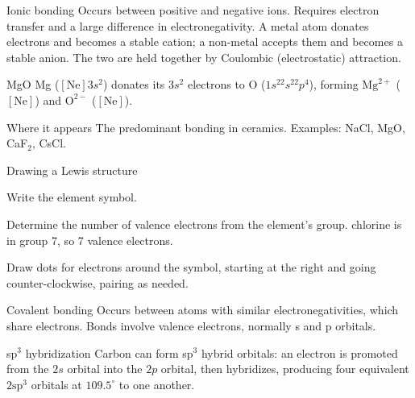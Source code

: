 \documentclass[11pt]{article}
\begin{document}

\begin{keydef}{Ionic bonding}
Occurs between positive and negative ions. Requires electron transfer and a
large difference in electronegativity. A metal atom donates electrons and
becomes a stable cation; a non-metal accepts them and becomes a stable anion.
The two are held together by Coulombic (electrostatic) attraction.
\end{keydef}

\begin{worked}{MgO}
Mg ($[\mathrm{Ne}]3s^2$) donates its $3s^2$ electrons to O ($1s^22s^22p^4$),
forming $\mathrm{Mg}^{2+}$ ($[\mathrm{Ne}]$) and $\mathrm{O}^{2-}$
($[\mathrm{Ne}]$). 
\end{worked}

\begin{keydef}{Where it appears}
The predominant bonding in ceramics. Examples: NaCl, MgO, CaF$_2$, CsCl.
\end{keydef}

\begin{method}{Drawing a Lewis structure}
\begin{steps}
\item Write the element symbol.
\item Determine the number of valence electrons from the element's group.
chlorine is in group 7, so 7 valence electrons.
\item Draw dots for electrons around the symbol, starting at the right and going
counter-clockwise, pairing as needed.
\end{steps}
\end{method}


\begin{keydef}{Covalent bonding}
Occurs between atoms with similar electronegativities, which share electrons.
Bonds involve valence electrons, normally s and p orbitals.
\end{keydef}

\begin{keydef}{sp$^3$ hybridization}
Carbon can form sp$^3$ hybrid orbitals: an electron is promoted from the $2s$
orbital into the $2p$ orbital, then hybridizes, producing four equivalent
$2\mathrm{sp}^3$ orbitals at $109.5^\circ$ to one another.
\end{keydef}
\end{document}
